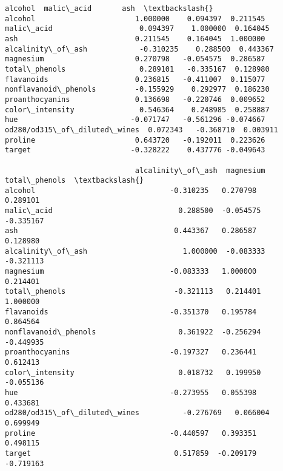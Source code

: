 \documentclass[11pt]{article}
\makeatletter
\newcommand{\boxspacing}{\kern\kvtcb@left@rule\kern\kvtcb@boxsep}
\newcommand{\prompt}[4]{
        {\ttfamily\llap{{\color{#2}[#3]:\hspace{3pt}#4}}\vspace{-\baselineskip}}
    }
\makeatother
\begin{document}
            \begin{tcolorbox}[breakable, size=fbox, boxrule=.5pt, pad at break*=1mm, opacityfill=0]
\prompt{Out}{outcolor}{116}{\boxspacing}
\begin{Verbatim}[commandchars=\\\{\}]
                               alcohol  malic\_acid       ash  \textbackslash{}
alcohol                       1.000000    0.094397  0.211545
malic\_acid                    0.094397    1.000000  0.164045
ash                           0.211545    0.164045  1.000000
alcalinity\_of\_ash            -0.310235    0.288500  0.443367
magnesium                     0.270798   -0.054575  0.286587
total\_phenols                 0.289101   -0.335167  0.128980
flavanoids                    0.236815   -0.411007  0.115077
nonflavanoid\_phenols         -0.155929    0.292977  0.186230
proanthocyanins               0.136698   -0.220746  0.009652
color\_intensity               0.546364    0.248985  0.258887
hue                          -0.071747   -0.561296 -0.074667
od280/od315\_of\_diluted\_wines  0.072343   -0.368710  0.003911
proline                       0.643720   -0.192011  0.223626
target                       -0.328222    0.437776 -0.049643

                              alcalinity\_of\_ash  magnesium  total\_phenols  \textbackslash{}
alcohol                               -0.310235   0.270798       0.289101
malic\_acid                             0.288500  -0.054575      -0.335167
ash                                    0.443367   0.286587       0.128980
alcalinity\_of\_ash                      1.000000  -0.083333      -0.321113
magnesium                             -0.083333   1.000000       0.214401
total\_phenols                         -0.321113   0.214401       1.000000
flavanoids                            -0.351370   0.195784       0.864564
nonflavanoid\_phenols                   0.361922  -0.256294      -0.449935
proanthocyanins                       -0.197327   0.236441       0.612413
color\_intensity                        0.018732   0.199950      -0.055136
hue                                   -0.273955   0.055398       0.433681
od280/od315\_of\_diluted\_wines          -0.276769   0.066004       0.699949
proline                               -0.440597   0.393351       0.498115
target                                 0.517859  -0.209179      -0.719163


\end{Verbatim}
\end{tcolorbox}
\end{document}
